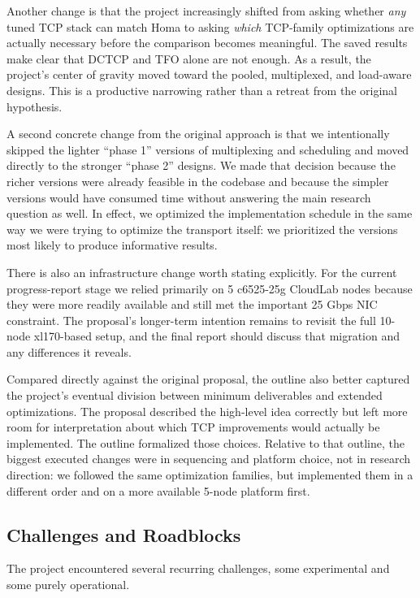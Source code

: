 \documentclass[11pt]{article}
\begin{document}
Another change is that the project increasingly shifted from asking whether \emph{any} tuned TCP stack can match Homa to asking \emph{which} TCP-family optimizations are actually necessary before the comparison becomes meaningful. The saved results make clear that DCTCP and TFO alone are not enough. As a result, the project's center of gravity moved toward the pooled, multiplexed, and load-aware designs. This is a productive narrowing rather than a retreat from the original hypothesis.

A second concrete change from the original approach is that we intentionally skipped the lighter ``phase 1'' versions of multiplexing and scheduling and moved directly to the stronger ``phase 2'' designs. We made that decision because the richer versions were already feasible in the codebase and because the simpler versions would have consumed time without answering the main research question as well. In effect, we optimized the implementation schedule in the same way we were trying to optimize the transport itself: we prioritized the versions most likely to produce informative results.

There is also an infrastructure change worth stating explicitly. For the current progress-report stage we relied primarily on 5 c6525-25g CloudLab nodes because they were more readily available and still met the important 25 Gbps NIC constraint. The proposal's longer-term intention remains to revisit the full 10-node xl170-based setup, and the final report should discuss that migration and any differences it reveals.

Compared directly against the original proposal, the outline also better captured the project's eventual division between minimum deliverables and extended optimizations. The proposal described the high-level idea correctly but left more room for interpretation about which TCP improvements would actually be implemented. The outline formalized those choices. Relative to that outline, the biggest executed changes were in sequencing and platform choice, not in research direction: we followed the same optimization families, but implemented them in a different order and on a more available 5-node platform first.

\subsection{Challenges and Roadblocks}

The project encountered several recurring challenges, some experimental and some purely operational.
\end{document}
